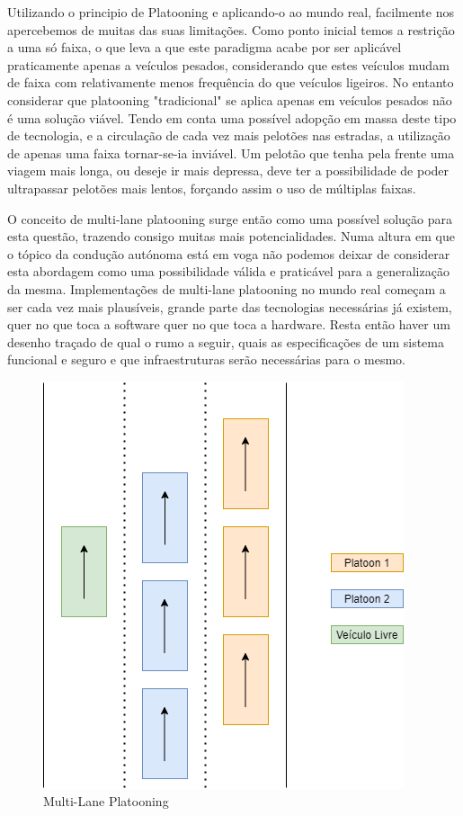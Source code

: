Utilizando o principio de Platooning e aplicando-o ao mundo real, facilmente nos apercebemos de muitas das suas limitações. Como ponto inicial temos a restrição a uma só faixa, o que leva a que este paradigma acabe por ser aplicável praticamente apenas a veículos pesados, considerando que estes veículos mudam de faixa com relativamente menos frequência do que veículos ligeiros. No entanto considerar que platooning "tradicional" se aplica apenas em veículos pesados não é uma solução viável. Tendo em conta uma possível adopção em massa deste tipo de tecnologia, e a circulação de cada vez mais pelotões nas estradas, a utilização de apenas uma faixa tornar-se-ia inviável. Um pelotão que tenha pela frente uma viagem mais longa, ou deseje ir mais depressa, deve ter a possibilidade de poder ultrapassar pelotões mais lentos, forçando assim o uso de múltiplas faixas.

O conceito de multi-lane platooning surge então como uma possível solução para esta questão, trazendo consigo muitas mais potencialidades. Numa altura em que o tópico da condução autónoma está em voga não podemos deixar de considerar esta abordagem como uma possibilidade válida e praticável para a generalização da mesma. Implementações de multi-lane platooning no mundo real começam a ser cada vez mais plausíveis, grande parte das tecnologias necessárias já existem, quer no que toca a software quer no que toca a hardware. Resta então haver um desenho traçado de qual o rumo a seguir, quais as especificações de um sistema funcional e seguro e que infraestruturas serão necessárias para o mesmo.

\begin{figure}[H]
    \centering
    \includegraphics[scale=0.4]{Images/multilaneplatooning.png}
    \caption{Multi-Lane Platooning}
    \label{fig:my_label}
\end{figure}

